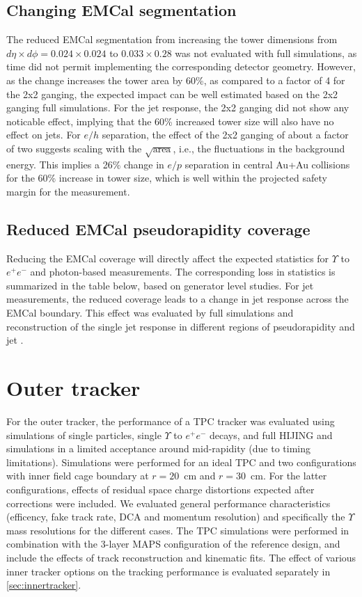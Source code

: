 \subsection{Changing EMCal segmentation}
The reduced EMCal segmentation from increasing the tower dimensions
from $d\eta \times d\phi = 0.024 \times 0.024$ to $0.033 \times 0.28$
was not evaluated with full \geant simulations, as time did not permit
implementing the corresponding detector geometry. However, as the
change increases the tower area by 60\%, as compared to a factor of 4
for the 2x2 ganging, the expected impact can be well estimated based
on the 2x2 ganging full simulations. For the jet response, the 2x2
ganging did not show any noticable effect, implying that the 60\%
increased tower size will also have no effect on jets. For $e/h$
separation, the effect of the 2x2 ganging of about a factor of two
suggests scaling with the $\sqrt{\mbox{area}}$, i.e., the fluctuations
in the background energy. This implies a 26\% change in $e/p$
separation in central Au+Au collisions for the 60\% increase in tower
size, which is well within the projected safety margin for the
measurement.

\subsection{Reduced EMCal pseudorapidity coverage}
Reducing the EMCal coverage will directly affect the expected statistics for $\Upsilon$ to $e^+ e^-$ and photon-based measurements. The 
corresponding loss in statistics is summarized in the table below, based on generator level studies. For jet measurements, the reduced 
coverage leads to a change in jet response across the EMCal boundary. This effect was evaluated by full \geant simulations and reconstruction
of the single jet response in different regions of pseudorapidity and jet \pt.

\section{Outer tracker}

For the outer tracker, the performance of a TPC tracker was evaluated using \geant simulations of single particles, single $\Upsilon$ to $e^+ e^-$
decays, and full HIJING and \geant simulations in a limited acceptance around mid-rapidity (due to timing limitations). Simulations were performed
for an ideal TPC and two configurations with inner field cage boundary at $r=20$~cm and $r=30$~cm. For the latter configurations, effects of 
residual space charge distortions expected after corrections were included. We evaluated general performance characteristics (efficency, fake track
rate, DCA and momentum resolution) and specifically the $\Upsilon$ mass resolutions for the different cases. The TPC simulations were performed
in combination with the 3-layer MAPS configuration of the reference design, and include the effects of track reconstruction and kinematic fits. 
The effect of various inner tracker options on the tracking performance is evaluated separately in \ref{sec:innertracker}.
